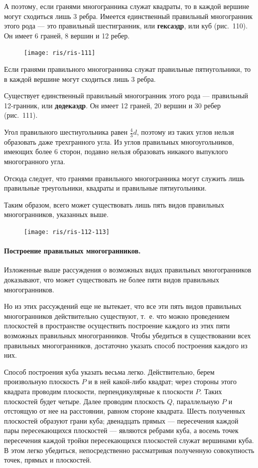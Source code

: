 \documentclass[twoside]{book}
\begin{document}
А поэтому, если гранями многогранника служат квадраты, то в каждой вершине могут сходиться лишь 3 ребра.
Имеется единственный правильный многогранник этого рода --- это правильный шестигранник, или \textbf{гексаэдр}, или куб (рис.~110).
Он имеет 6 граней, 8 вершин и 12 ребер.

\begin{figure}[h!]
\centering
\texttt{[image: ris/ris-111]}
\caption{}
\end{figure}

Если гранями правильного многогранника служат правильные пятиугольники, то в каждой вершине могут сходиться лишь 3 ребра.

Существует единственный правильный многогранник этого рода --- правильный 12-гранник, или \textbf{додекаэдр}.
Он имеет 12 граней, 20 вершин и 30 ребер (рис.~111).

Угол правильного шестиугольника равен  $\tfrac43d$, поэтому из таких углов нельзя образовать даже трехгранного угла.
Из углов правильных многоугольников, имеющих более 6 сторон, подавно нельзя образовать никакого выпуклого многогранного угла.

Отсюда следует, что гранями правильного многогранника могут служить лишь правильные треугольники, квадраты и правильные пятиугольники.

Таким образом, всего может существовать лишь пять видов правильных многогранников, указанных выше.

\begin{figure}[h!]
\centering
\texttt{[image: ris/ris-112-113]}
\caption{}
\end{figure}

\paragraph{Построение правильных многогранников.}\label{1938/s98}
Изложенные выше рассуждения о возможных видах правильных многогранников доказывают, что может существовать не более пяти видов правильных многогранников.

Но из этих рассуждений еще не вытекает, что все эти пять видов правильных многогранников действительно существуют, т.~е. что можно проведением плоскостей в пространстве осуществить построение каждого из этих пяти возможных правильных многогранников.
Чтобы убедиться в существовании всех правильных многогранников, достаточно указать способ построения каждого из них.

Способ построения куба указать весьма легко.
Действительно, берем произвольную плоскость $P$ и в ней какой-либо квадрат;
через стороны этого квадрата проводим плоскости, перпендикулярные к плоскости $P$.
Таких плоскостей будет четыре.
Далее проводим плоскость $Q$, параллельную $P$ и отстоящую от нее на расстоянии, равном стороне квадрата.
Шесть полученных плоскостей образуют грани куба;
двенадцать прямых --- пересечения каждой пары пересекающихся плоскостей --- являются ребрами куба, а восемь точек пересечения каждой тройки пересекающихся плоскостей служат вершинами куба.
В этом легко убедиться, непосредственно рассматривая полученную совокупность точек, прямых и плоскостей. %
\end{document}
